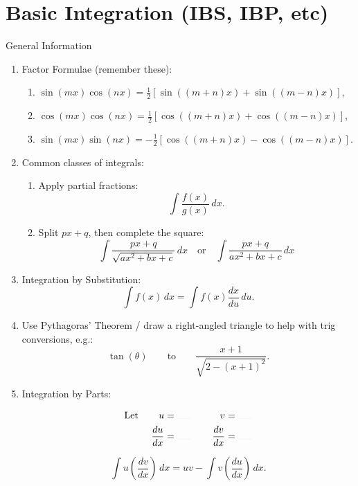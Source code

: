 \documentclass[oneside]{book}
\begin{document}
\section{Basic Integration (IBS, IBP, etc)}
\begin{stbox}{General Information}
  \begin{enumerate}
    \item Factor Formulae (remember these):
    \begin{enumerate}
      \item \(\sin(mx)\cos(nx)=\frac{1}{2}[\sin((m+n)x)+\sin((m-n)x)]\),
      \item \(\cos(mx)\cos(nx)=\frac{1}{2}[\cos((m+n)x)+\cos((m-n)x)]\),
      \item \(\sin(mx)\sin(nx)=-\frac{1}{2}[\cos((m+n)x)-\cos((m-n)x)]\).
    \end{enumerate}
    \item Common classes of integrals:
    \begin{enumerate}
      \item Apply partial fractions:
      \[\int\frac{f(x)}{g(x)}\,dx.\]
      \item Split \(px+q\), then complete the square:
      \[\int \frac{px+q}{\sqrt{ax^2+bx+c}}\,dx \quad\text{or}\quad \int \frac{px+q}{ax^2+bx+c}\,dx\] 
    \end{enumerate}
    \item Integration by Substitution: 
    \[\int f(x) \, dx=\int f(x)\frac{dx}{du}\,du.\]
    \item Use Pythagoras' Theorem / draw a right-angled triangle to help with trig conversions, e.g.:
    \[\tan(\theta) \qquad\text{to}\qquad \frac{x+1}{\sqrt{2-(x+1)^2}}.\]
    \item Integration by Parts:

    \begin{minipage}{0.5\textwidth-12.5pt}
      \begin{alignat*}{3}
        &\text{Let }& u&=\rule{0.5cm}{0.01mm} &\qquad  v&=\rule{0.5cm}{0.01mm}\\
        &&\dfrac{du}{dx} &=\rule{0.5cm}{0.01mm} & \dfrac{dv}{dx}&=\rule{0.5cm}{0.01mm}
       \end{alignat*} 
    \end{minipage}%
    \begin{minipage}{0.5\textwidth-12.5pt}
      \[\int u\left(\frac{dv}{dx}\right)\,dx=uv-\int v \left(\frac{du}{dx}\right)\,dx.\]
    \end{minipage}
  \end{enumerate}
\end{stbox}
\newpage
\end{document}
